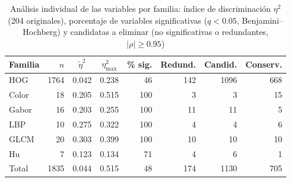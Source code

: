\begin{table}[!t]
\caption{Análisis individual de las variables por familia: índice de discriminación $\eta^2$ (204 originales), porcentaje de variables significativas ($q<0.05$, Benjamini--Hochberg) y candidatas a eliminar (no significativas o redundantes, $|\rho|\ge0.95$)}
\label{tab:ind}
\centering\footnotesize
\setlength{\tabcolsep}{2.6pt}\renewcommand{\arraystretch}{1.05}
\begin{tabular}{@{}l r c c r r r r@{}}
\toprule
Familia & $n$ & $\tilde\eta^2$ & $\eta^2_{\max}$ & \% sig. & Redund. & Candid. & Conserv.\\
\midrule
HOG & 1764 & 0.042 & 0.238 & 46 & 142 & 1096 & 668\\
Color & 18 & 0.205 & 0.515 & 100 & 3 & 3 & 15\\
Gabor & 16 & 0.203 & 0.255 & 100 & 11 & 11 & 5\\
LBP & 10 & 0.275 & 0.322 & 100 & 4 & 4 & 6\\
GLCM & 20 & 0.303 & 0.399 & 100 & 10 & 10 & 10\\
Hu & 7 & 0.123 & 0.134 & 71 & 4 & 6 & 1\\
\midrule
Total & 1835 & 0.044 & 0.515 & 48 & 174 & 1130 & 705\\
\bottomrule
\end{tabular}
\end{table}
